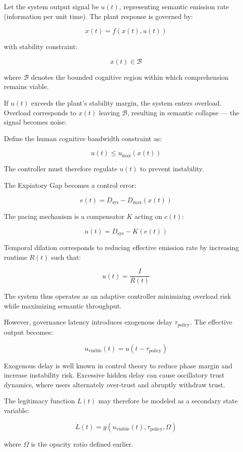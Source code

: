 \documentclass[12pt]{article}
\begin{document}
Let the system output signal be $u(t)$, representing semantic emission rate (information per unit time). The plant response is governed by:

\[
\dot{x}(t) = f(x(t), u(t))
\]

with stability constraint:

\[
x(t) \in \mathcal{B}
\]

where $\mathcal{B}$ denotes the bounded cognitive region within which comprehension remains viable.

If $u(t)$ exceeds the plant’s stability margin, the system enters overload. Overload corresponds to $x(t)$ leaving $\mathcal{B}$, resulting in semantic collapse — the signal becomes noise.

Define the human cognitive bandwidth constraint as:

\[
u(t) \leq u_{\max}(x(t))
\]

The controller must therefore regulate $u(t)$ to prevent instability.

The Expiatory Gap becomes a control error:

\[
e(t) = D_{\text{sys}} - D_{\max}(x(t))
\]

The pacing mechanism is a compensator $K$ acting on $e(t)$:

\[
u(t) = D_{\text{sys}} - K(e(t))
\]

Temporal dilation corresponds to reducing effective emission rate by increasing runtime $R(t)$ such that:

\[
u(t) = \frac{I}{R(t)}
\]

The system thus operates as an adaptive controller minimizing overload risk while maximizing semantic throughput.

However, governance latency introduces exogenous delay $\tau_{\text{policy}}$. The effective output becomes:

\[
u_{\text{visible}}(t) = u(t - \tau_{\text{policy}})
\]

Exogenous delay is well known in control theory to reduce phase margin and increase instability risk. Excessive hidden delay can cause oscillatory trust dynamics, where users alternately over-trust and abruptly withdraw trust.

The legitimacy function $L(t)$ may therefore be modeled as a secondary state variable:

\[
\dot{L}(t) = g(u_{\text{visible}}(t), \tau_{\text{policy}}, \Omega)
\]

where $\Omega$ is the opacity ratio defined earlier.
\end{document}
